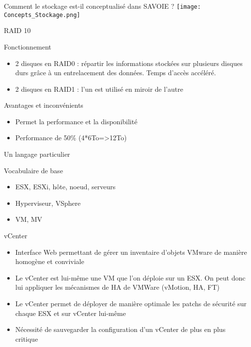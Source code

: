\documentclass[10pt]{beamer}
\begin{document}
\begin{center}
\begin{frame}{Comment le stockage est-il conceptualisé dans SAVOIE ?}
\texttt{[image: Concepts\_Stockage.png]}
\end{frame}
\end{center}









\begin{frame}{RAID 10}
\begin{block}{Fonctionnement}
\begin{itemize}
\item 2 disques en RAID0 : répartir les informations stockées sur plusieurs disques durs grâce à un entrelacement des données. Temps d'accès accéléré.
\item 2 disques en RAID1 : l’un est utilisé en miroir de l'autre
\end{itemize}
\end{block}
\begin{block}{Avantages et inconvénients}
\begin{itemize}
\item Permet la performance et la disponibilité
\item Performance de 50\% (4*6To=>12To)
\end{itemize}
\end{block}
\end{frame}

 
\begin{frame}{Un langage particulier}
\begin{block}{Vocabulaire de base}
\begin{itemize}
\item ESX, ESXi, hôte, noeud, serveurs
\item Hyperviseur, VSphere
\item VM, MV
\end{itemize}  
\end{block} 

\end{frame}



\begin{frame}{vCenter}
\begin{block}{}
\begin{itemize}
\item Interface Web permettant de gérer un inventaire d’objets VMware de manière homogène et conviviale
\item Le vCenter est lui-même une VM que l’on déploie sur un ESX. On peut donc lui appliquer les mécanismes de HA de VMWare (vMotion, HA, FT)
\item Le vCenter permet de déployer de manière optimale les patchs de sécurité sur chaque ESX et sur vCenter lui-même
\item Nécessité de sauvegarder la configuration d’un vCenter de plus en plus critique
\end{itemize}
\end{block}
\end{frame}
\end{document}
